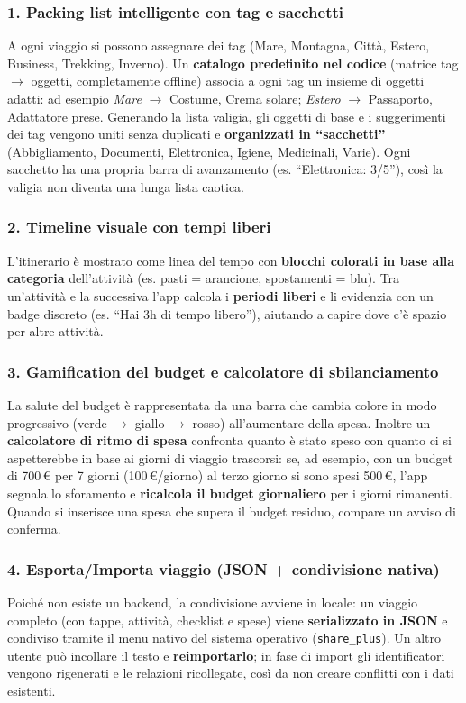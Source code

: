 \documentclass[11pt, a4paper]{article}
\begin{document}
\subsubsection*{1. Packing list intelligente con tag e sacchetti}
A ogni viaggio si possono assegnare dei tag (Mare, Montagna, Città, Estero,
Business, Trekking, Inverno). Un \textbf{catalogo predefinito nel codice}
(matrice tag $\rightarrow$ oggetti, completamente offline) associa a ogni tag un
insieme di oggetti adatti: ad esempio \textit{Mare} $\rightarrow$ Costume, Crema
solare; \textit{Estero} $\rightarrow$ Passaporto, Adattatore prese. Generando la
lista valigia, gli oggetti di base e i suggerimenti dei tag vengono uniti senza
duplicati e \textbf{organizzati in ``sacchetti''} (Abbigliamento, Documenti,
Elettronica, Igiene, Medicinali, Varie). Ogni sacchetto ha una propria barra di
avanzamento (es. ``Elettronica: 3/5''), così la valigia non diventa una lunga
lista caotica.

\subsubsection*{2. Timeline visuale con tempi liberi}
L'itinerario è mostrato come linea del tempo con \textbf{blocchi colorati in base
alla categoria} dell'attività (es. pasti = arancione, spostamenti = blu). Tra
un'attività e la successiva l'app calcola i \textbf{periodi liberi} e li
evidenzia con un badge discreto (es. ``Hai 3h di tempo libero''), aiutando a
capire dove c'è spazio per altre attività.

\subsubsection*{3. Gamification del budget e calcolatore di sbilanciamento}
La salute del budget è rappresentata da una barra che cambia colore in modo
progressivo (verde $\rightarrow$ giallo $\rightarrow$ rosso) all'aumentare della
spesa. Inoltre un \textbf{calcolatore di ritmo di spesa} confronta quanto è stato
speso con quanto ci si aspetterebbe in base ai giorni di viaggio trascorsi: se,
ad esempio, con un budget di 700\,\euro{} per 7 giorni (100\,\euro/giorno) al
terzo giorno si sono spesi 500\,\euro, l'app segnala lo sforamento e
\textbf{ricalcola il budget giornaliero} per i giorni rimanenti. Quando si
inserisce una spesa che supera il budget residuo, compare un avviso di conferma.

\subsubsection*{4. Esporta/Importa viaggio (JSON + condivisione nativa)}
Poiché non esiste un backend, la condivisione avviene in locale: un viaggio
completo (con tappe, attività, checklist e spese) viene \textbf{serializzato in
JSON} e condiviso tramite il menu nativo del sistema operativo (\texttt{share\_plus}).
Un altro utente può incollare il testo e \textbf{reimportarlo}; in fase di import
gli identificatori vengono rigenerati e le relazioni ricollegate, così da non
creare conflitti con i dati esistenti.
\end{document}
